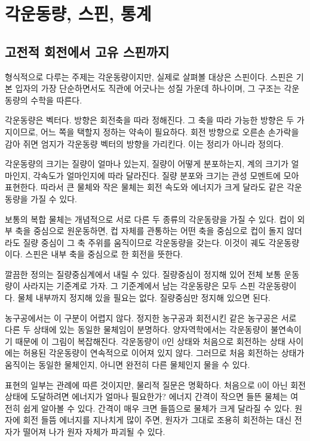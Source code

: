 \chapter{각운동량, 스핀, 통계}

\section{고전적 회전에서 고유 스핀까지}

형식적으로 다루는 주제는 각운동량이지만, 실제로 살펴볼 대상은 스핀이다. 스핀은 기본 입자의 가장 단순하면서도 직관에 어긋나는 성질 가운데 하나이며, 그 구조는 각운동량의 수학을 따른다.

각운동량은 벡터다. 방향은 회전축을 따라 정해진다. 그 축을 따라 가능한 방향은 두 가지이므로, 어느 쪽을 택할지 정하는 약속이 필요하다. 회전 방향으로 오른손 손가락을 감아 쥐면 엄지가 각운동량 벡터의 방향을 가리킨다. 이는 정리가 아니라 정의다.

각운동량의 크기는 질량이 얼마나 있는지, 질량이 어떻게 분포하는지, 계의 크기가 얼마인지, 각속도가 얼마인지에 따라 달라진다. 질량 분포와 크기는 관성 모멘트에 모아 표현한다. 따라서 큰 물체와 작은 물체는 회전 속도와 에너지가 크게 달라도 같은 각운동량을 가질 수 있다.

보통의 복합 물체는 개념적으로 서로 다른 두 종류의 각운동량을 가질 수 있다. 컵이 외부 축을 중심으로 원운동하면, 컵 자체를 관통하는 어떤 축을 중심으로 컵이 돌지 않더라도 질량 중심이 그 축 주위를 움직이므로 각운동량을 갖는다. 이것이 궤도 각운동량이다. 스핀은 내부 축을 중심으로 한 회전을 뜻한다.

깔끔한 정의는 질량중심계에서 내릴 수 있다. 질량중심이 정지해 있어 전체 보통 운동량이 사라지는 기준계로 가자. 그 기준계에서 남는 각운동량은 모두 스핀 각운동량이다. 물체 내부까지 정지해 있을 필요는 없다. 질량중심만 정지해 있으면 된다.

농구공에서는 이 구분이 어렵지 않다. 정지한 농구공과 회전시킨 같은 농구공은 서로 다른 두 상태에 있는 동일한 물체임이 분명하다. 양자역학에서는 각운동량이 불연속이기 때문에 이 그림이 복잡해진다. 각운동량이 0인 상태와 처음으로 회전하는 상태 사이에는 허용된 각운동량이 연속적으로 이어져 있지 않다. 그러므로 처음 회전하는 상태가 움직이는 동일한 물체인지, 아니면 완전히 다른 물체인지 물을 수 있다.

표현의 일부는 관례에 따른 것이지만, 물리적 질문은 명확하다. 처음으로 0이 아닌 회전 상태에 도달하려면 에너지가 얼마나 필요한가? 에너지 간격이 작으면 들뜬 물체는 여전히 쉽게 알아볼 수 있다. 간격이 매우 크면 들뜸으로 물체가 크게 달라질 수 있다. 원자에 회전 들뜸 에너지를 지나치게 많이 주면, 원자가 그대로 조용히 회전하는 대신 전자가 떨어져 나가 원자 자체가 파괴될 수 있다.

